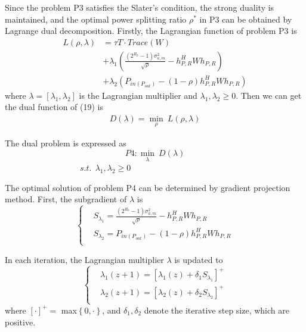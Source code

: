 \documentclass[conference]{IEEEtran}
\begin{document}
Since the problem P3 satisfies the Slater's condition, the strong duality is maintained, and the optimal power splitting ratio $\rho^{\ast}$ in P3 can be obtained by Lagrange dual decomposition. 
Firstly, the Lagrangian function of problem P3 is 
\begin{equation}\label{eqn-2}
  \begin{aligned}
	L(\rho ,\lambda )&=\tau T\cdot Trace(W) \\& +\lambda _{1} (  \frac{\left ( 2^{R_{0} }-1  \right )\sigma _{a,m}^{2}  }				{\sqrt{\rho } }-h_{P,R}^{H}Wh_{P,R}) \\& +\lambda _{2}(P_{in(P_{out} )} - \left ( 1-\rho  \right )h_{P,R}^{H}Wh_{P,R}) 
  \end{aligned}
\end{equation}
where $\lambda=[\lambda_{1} , \lambda_{2}]$ is the Lagrangian multiplier and $\lambda_{1} , \lambda_{2}\ge 0$. 
Then we can get the dual function of (19) is 
\begin{equation}\label{eqn-2}
  \begin{aligned}
	D(\lambda )=\underset{\rho}{\min} \ L(\rho,\lambda )
  \end{aligned}
\end{equation}

The dual problem is expressed as
$$P4:\underset{\lambda}{\min} \ D(\lambda )$$
$\qquad \qquad \qquad  \qquad \quad  s.t.\ \ \lambda_{1} , \lambda_{2}\ge 0$

The optimal solution of problem P4 can be determined by gradient projection method. First, the subgradient of $\lambda$ is
\begin{equation}
\left\{
\begin{aligned}
&S_{\lambda _{1} } =\frac{\left ( 2^{R_{0} }-1  \right )\sigma _{a,m}^{2}  }{\sqrt{\rho } }-h_{P,R}^{H}Wh_{P,R}\\
&S_{\lambda _{2} } =P_{in(P_{out} )} - \left ( 1-\rho  \right )h_{P,R}^{H}Wh_{P,R}\\
\end{aligned}
\right.
\end{equation}

In each iteration, the Lagrangian multiplier $\lambda$ is updated to
\begin{equation}
\left\{
\begin{aligned}
&\lambda _{1}(z+1)=[\lambda _{1}(z)+\delta _{1} S_{\lambda _{1}} ]^{+} \\
&\lambda _{2}(z+1)=[\lambda _{2}(z)+\delta _{2} S_{\lambda _{2}} ]^{+} \\
\end{aligned}
\right.
\end{equation}
where $[\cdot ]^{+} =$ max$\left \{ 0,\cdot  \right \}  $, and $\delta _{1} ,\delta _{2} $ denote the iterative step size, which are positive.
\end{document}
